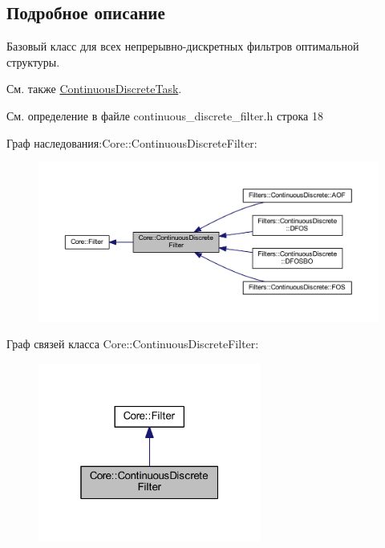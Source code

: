 \subsection{Подробное описание}
Базовый класс для всех непрерывно-\/дискретных фильтров оптимальной структуры. 

\begin{DoxySeeAlso}{См. также}
\hyperlink{class_core_1_1_continuous_discrete_task}{Continuous\+Discrete\+Task}. 
\end{DoxySeeAlso}


См. определение в файле continuous\+\_\+discrete\+\_\+filter.\+h строка 18



Граф наследования\+:Core\+:\+:Continuous\+Discrete\+Filter\+:\nopagebreak
\begin{figure}[H]
\begin{center}
\leavevmode
\includegraphics[width=350pt]{class_core_1_1_continuous_discrete_filter__inherit__graph}
\end{center}
\end{figure}


Граф связей класса Core\+:\+:Continuous\+Discrete\+Filter\+:\nopagebreak
\begin{figure}[H]
\begin{center}
\leavevmode
\includegraphics[width=208pt]{class_core_1_1_continuous_discrete_filter__coll__graph}
\end{center}
\end{figure}



